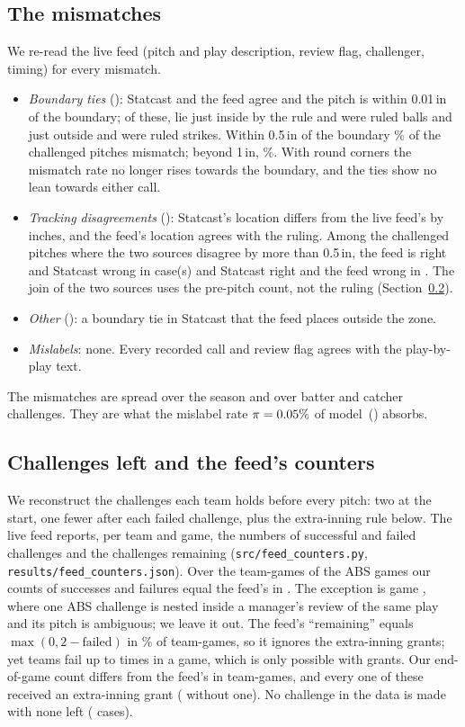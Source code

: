 \documentclass[aoas]{imsart}
\theoremstyle{plain}
\theoremstyle{definition}
\begin{document}
\subsection{The \SMisN{} mismatches}\label{sec:mismatch}
We re-read the live feed (pitch and play description, review flag, challenger, timing) for every mismatch.
\begin{itemize}
\item \emph{Boundary ties} (\SMisTie): Statcast and the feed agree and the pitch is within 0.01\,in of the
boundary; of these, \SMisTieBall{} lie just inside by the rule and were ruled balls and \SMisTieStrike{} just outside and were
ruled strikes. Within 0.5\,in of the boundary \SMisNearRate\% of the \SMisNearN{} challenged pitches mismatch; beyond 1\,in,
\SMisFarRate\%. With round corners the mismatch rate no longer rises towards the boundary, and the ties show no lean
towards either call.
\item \emph{Tracking disagreements} (\SMisTrack): Statcast's location differs from the live feed's by inches, and the
feed's location agrees with the ruling. Among the \SMisDisagree{} challenged pitches where the two
sources disagree by more than 0.5\,in, the feed is right and Statcast wrong in \SMisFeedRight{} case(s) and Statcast right and the feed wrong in \SMisStatcastRight. The join of the two sources uses the pre-pitch count, not the ruling (Section~\ref{sec:counters}).
\item \emph{Other} (\SMisOther): a boundary tie in Statcast that the feed places outside the zone.
\item \emph{Mislabels}: none. Every recorded call and review flag agrees with the play-by-play text.
\end{itemize}
The mismatches are spread over the season and over batter and catcher challenges. They are what the mislabel rate
$\pi=0.05\%$ of model~() absorbs.

\subsection{Challenges left and the feed's counters}\label{sec:counters}
We reconstruct the challenges each team holds before every pitch: two at the start, one fewer after each failed
challenge, plus the extra-inning rule below. The live feed reports, per team and game, the numbers of successful and
failed challenges and the challenges remaining (\texttt{src/feed\_counters.py}, \texttt{results/feed\_counters.json}).
Over the \SFcTeamGames{} team-games of the \NGamesABS{} ABS games our counts of successes and failures equal the
feed's in \SFcMatch. The exception is game \SFcBadGame, where one ABS challenge is nested inside a manager's review of
the same play and its pitch is ambiguous; we leave it out. The feed's ``remaining'' equals $\max(0,2-\text{failed})$ in
\SFcRemainingRule\% of team-games, so it ignores the extra-inning grants; yet teams fail up to \SFcMaxFailed{} times in
a game, which is only possible with grants. Our end-of-game count differs from the feed's in \SFcDiffer{} team-games,
and every one of these received an extra-inning grant (\SFcDifferNoGrant{} without one). No challenge in the data is made with none left
(\SFcZeroLeft{} cases).
\end{document}
